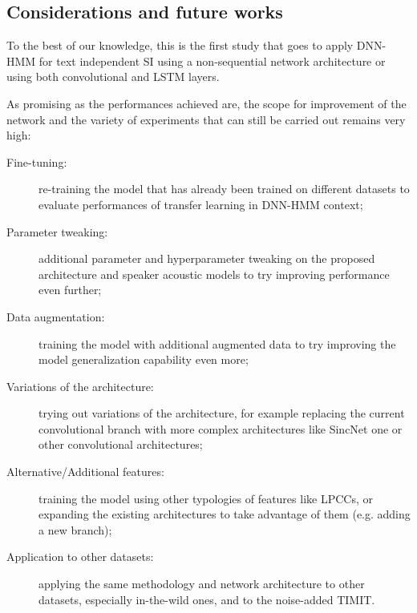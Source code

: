 \subsection{Considerations and future works}
To the best of our knowledge, this is the first study that goes to apply DNN-HMM for text independent SI using a non-sequential network architecture or using both convolutional and LSTM layers.

As promising as the performances achieved are, the scope for improvement of the network and the variety of experiments that can still be carried out remains very high:

\begin{description}
	\item[Fine-tuning:] re-training the model that has already been trained on different datasets to evaluate performances of transfer learning in DNN-HMM context;
	
	\item[Parameter tweaking:] additional parameter and hyperparameter tweaking on the proposed architecture and speaker acoustic models to try improving performance even further;
	
	\item[Data augmentation:] training the model with additional augmented data to try improving the model generalization capability even more;
	
	\item[Variations of the architecture:] trying out variations of the architecture, for example replacing the current convolutional branch with more complex architectures like SincNet one \cite{si:sincnet} or other convolutional architectures;
	
	\item[Alternative/Additional features:] training the model using other typologies of features like LPCCs, or expanding the existing architectures to take advantage of them (e.g. adding a new branch);
	
	\item[Application to other datasets:] applying the same methodology and network architecture to other datasets, especially in-the-wild ones, and to the noise-added TIMIT.
\end{description}
